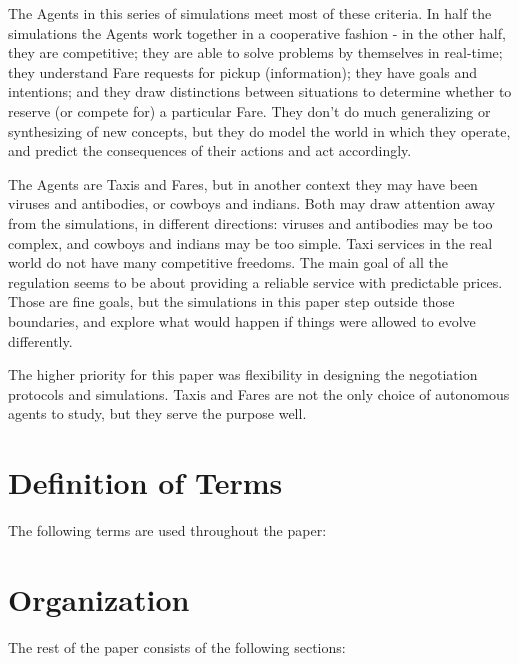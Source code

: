 \documentclass[11pt,letterpaper,onecolumn,twoside,openright,draft]{report}
\begin{document}
The Agents in this series of simulations meet most of these criteria.
In half the simulations the Agents work together in a cooperative fashion - in the other half, they are competitive; they are able to solve problems by themselves in real-time; they understand Fare requests for pickup (information); they have goals and intentions; and they draw distinctions between situations to determine whether to reserve (or compete for) a particular Fare.
They don't do much generalizing or synthesizing of new concepts, but they do model the world in which they operate, and predict the consequences of their actions and act accordingly.

The Agents are Taxis and Fares, but in another context they may have been viruses and antibodies, or cowboys and indians.
Both may draw attention away from the simulations, in different directions: viruses and antibodies may be too complex, and cowboys and indians may be too simple.
Taxi services in the real world do not have many competitive freedoms.
The main goal of all the regulation seems to be about providing a reliable service with predictable prices.
Those are fine goals, but the simulations in this paper step outside those boundaries, and explore what would happen if things were allowed to evolve differently.

The higher priority for this paper was flexibility in designing the negotiation protocols and simulations.
Taxis and Fares are not the only choice of autonomous agents to study, but they serve the purpose well.

\section{Definition of Terms}
The following terms are used throughout the paper:

\section{Organization}
The rest of the paper consists of the following sections:
\end{document}
